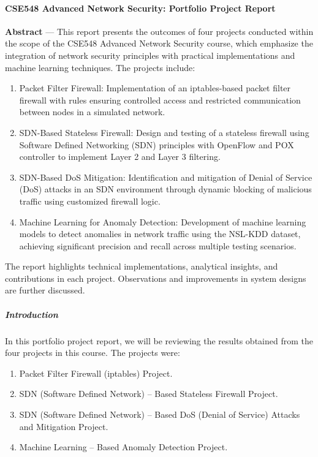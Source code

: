 \paragraph{CSE548 Advanced Network Security: Portfolio Project Report}

\textbf{Abstract} --- This report presents the outcomes of four projects conducted within the scope of the CSE548 Advanced Network Security course, which emphasize the integration of network security principles with practical implementations and machine learning techniques. The projects include:

\begin{enumerate}
\item Packet Filter Firewall: Implementation of an iptables-based packet filter firewall with rules ensuring controlled access and restricted communication between nodes in a simulated network.
\item SDN-Based Stateless Firewall: Design and testing of a stateless firewall using Software Defined Networking (SDN) principles with OpenFlow and POX controller to implement Layer 2 and Layer 3 filtering.
\item SDN-Based DoS Mitigation: Identification and mitigation of Denial of Service (DoS) attacks in an SDN environment through dynamic blocking of malicious traffic using customized firewall logic.
\item Machine Learning for Anomaly Detection: Development of machine learning models to detect anomalies in network traffic using the NSL-KDD dataset, achieving significant precision and recall across multiple testing scenarios.
\end{enumerate}

The report highlights technical implementations, analytical insights, and contributions in each project.  Observations and improvements in system designs are further discussed.

\subparagraph{Introduction}

In this portfolio project report, we will be reviewing the results obtained from the four projects in this course.  The projects were:

\begin{enumerate}
\item Packet Filter Firewall (iptables) Project.
\item SDN (Software Defined Network) -- Based Stateless Firewall Project.
\item SDN (Software Defined Network) -- Based DoS (Denial of Service) Attacks and Mitigation Project.
\item Machine Learning -- Based Anomaly Detection Project.
\end{enumerate}

